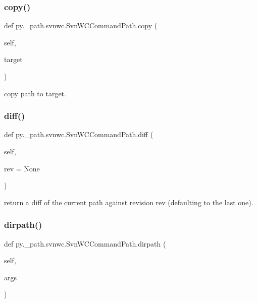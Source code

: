 \subsubsection{\texorpdfstring{copy()}{copy()}}
{\footnotesize\ttfamily def py.\+\_\+path.\+svnwc.\+Svn\+W\+C\+Command\+Path.\+copy (\begin{DoxyParamCaption}\item[{}]{self,  }\item[{}]{target }\end{DoxyParamCaption})}

\begin{DoxyVerb}copy path to target.\end{DoxyVerb}
 \mbox{\label{classpy_1_1__path_1_1svnwc_1_1_svn_w_c_command_path_a50804ebe76d4abf5235c164b8e377f71}} 
\subsubsection{\texorpdfstring{diff()}{diff()}}
{\footnotesize\ttfamily def py.\+\_\+path.\+svnwc.\+Svn\+W\+C\+Command\+Path.\+diff (\begin{DoxyParamCaption}\item[{}]{self,  }\item[{}]{rev = {\ttfamily None} }\end{DoxyParamCaption})}

\begin{DoxyVerb}return a diff of the current path against revision rev (defaulting
    to the last one).
\end{DoxyVerb}
 \mbox{\label{classpy_1_1__path_1_1svnwc_1_1_svn_w_c_command_path_a3055d71d6a893eb1324f47be47e72847}} 
\subsubsection{\texorpdfstring{dirpath()}{dirpath()}}
{\footnotesize\ttfamily def py.\+\_\+path.\+svnwc.\+Svn\+W\+C\+Command\+Path.\+dirpath (\begin{DoxyParamCaption}\item[{}]{self,  }\item[{}]{args }\end{DoxyParamCaption})}

